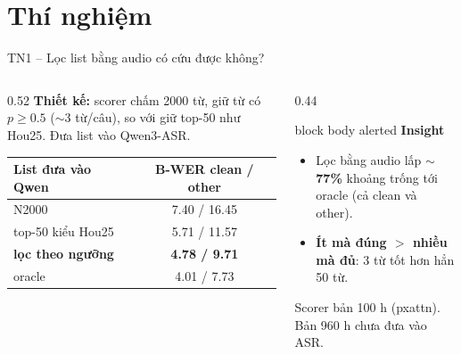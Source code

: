 \documentclass[aspectratio=169,xcolor=table]{beamer}
\newcommand{\good}[1]{\textcolor{GoodGreen}{\textbf{#1}}}
\begin{document}
\section{Thí nghiệm}
\begin{frame}{TN1 -- Lọc list bằng audio có cứu được không?}
\begin{columns}[T]
\begin{column}{0.52\textwidth}
\textbf{Thiết kế:} scorer chấm 2000 từ, giữ từ có $p\geq0.5$ ($\sim$3 từ/câu), so với giữ top-50 như Hou25. Đưa list vào Qwen3-ASR.\par\vspace{0.3cm}
\begin{tabular}{lc}
\toprule
List đưa vào Qwen & B-WER clean / other\\
\midrule
N2000 & 7.40 / 16.45\\
top-50 kiểu Hou25 & 5.71 / 11.57\\
\textbf{lọc theo ngưỡng} & \good{4.78 / 9.71}\\
oracle & 4.01 / 7.73\\
\bottomrule
\end{tabular}
\end{column}
\begin{column}{0.44\textwidth}
\begin{beamercolorbox}[sep=0.55em,rounded=true]{block body alerted}
\textbf{Insight}
\begin{itemize}
\item Lọc bằng audio lấp \good{$\sim$77\%} khoảng trống tới oracle (cả clean và other).
\item \textbf{Ít mà đúng $>$ nhiều mà đủ}: 3 từ tốt hơn hẳn 50 từ.
\end{itemize}
\end{beamercolorbox}
\vspace{0.2cm}
{\scriptsize Scorer bản 100 h (pxattn). Bản 960 h chưa đưa vào ASR.}
\end{column}
\end{columns}
\end{frame}
\end{document}
